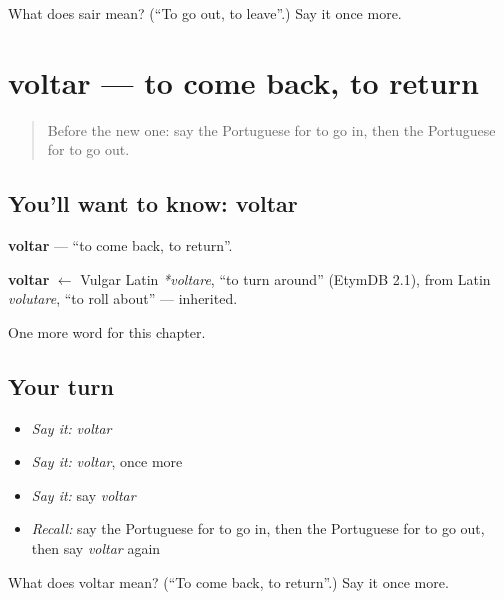 \begin{tcolorbox}[breakable,colback=teal!4,colframe=teal!35!black,title={Before you move on}]
What does sair mean? (\textquotedblleft{}To go out, to leave\textquotedblright{}.) Say it once more.
\end{tcolorbox}
\section[voltar]{voltar — to come back, to return}

\label{lesson:PT-C55-voltar}



\begin{quote}
Before the new one: say the Portuguese for to go in, then the Portuguese for to go out.
\end{quote}

\subsection*{You'll want to know: voltar}
\textbf{voltar} — \textquotedblleft{}to come back, to return\textquotedblright{}.

\begin{cousinweb}
\textbf{voltar} $\leftarrow$ Vulgar Latin \emph{*voltare}, \textquotedblleft{}to turn around\textquotedblright{} (EtymDB 2.1), from Latin \emph{volutare}, \textquotedblleft{}to roll about\textquotedblright{} — inherited.
\end{cousinweb}

\begin{grammarlens}[title={What you've built}]
One more word for this chapter.
\end{grammarlens}

\subsection*{Your turn}
\begin{itemize}
\raggedright
  \item \emph{Say it:} \emph{voltar}
  \item \emph{Say it:} \emph{voltar}, once more
  \item \emph{Say it:} say \emph{voltar}
  \item \emph{Recall:} say the Portuguese for to go in, then the Portuguese for to go out, then say \emph{voltar} again
\end{itemize}

\begin{tcolorbox}[breakable,colback=teal!4,colframe=teal!35!black,title={Before you move on}]
What does voltar mean? (\textquotedblleft{}To come back, to return\textquotedblright{}.) Say it once more.
\end{tcolorbox}
